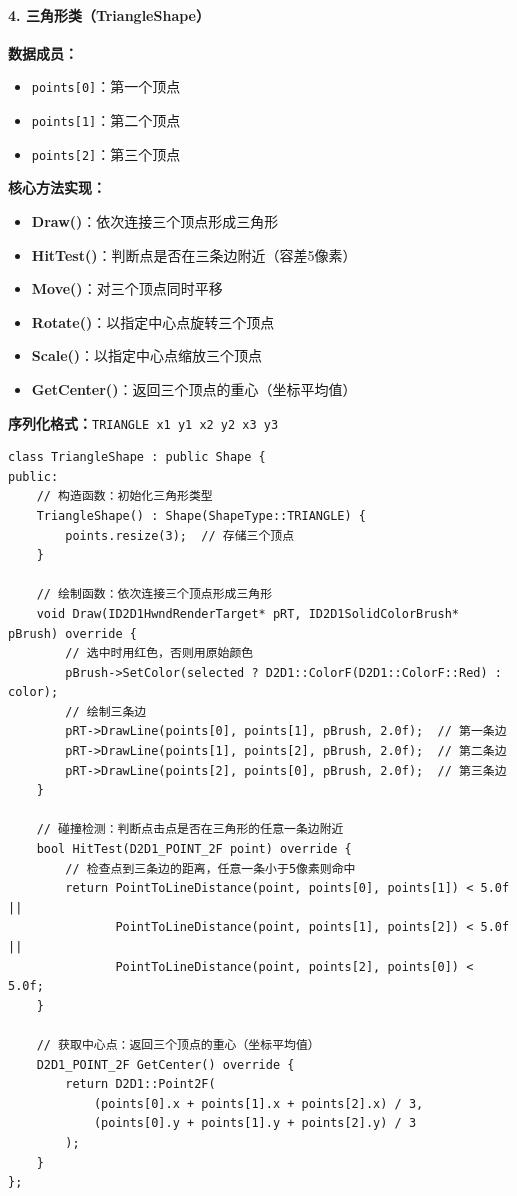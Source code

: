 \documentclass[12pt,a4paper]{article}
\begin{document}
\paragraph{4. 三角形类（TriangleShape）}

\begin{tcolorbox}
\textbf{数据成员：}
\begin{itemize}
    \item \texttt{points[0]}：第一个顶点
    \item \texttt{points[1]}：第二个顶点
    \item \texttt{points[2]}：第三个顶点
\end{itemize}

\textbf{核心方法实现：}
\begin{itemize}
    \item \textbf{Draw()}：依次连接三个顶点形成三角形
    \item \textbf{HitTest()}：判断点是否在三条边附近（容差5像素）
    \item \textbf{Move()}：对三个顶点同时平移
    \item \textbf{Rotate()}：以指定中心点旋转三个顶点
    \item \textbf{Scale()}：以指定中心点缩放三个顶点
    \item \textbf{GetCenter()}：返回三个顶点的重心（坐标平均值）
\end{itemize}

\textbf{序列化格式：}\texttt{TRIANGLE x1 y1 x2 y2 x3 y3}
\end{tcolorbox}

\begin{lstlisting}[caption=TriangleShape类定义]
class TriangleShape : public Shape {
public:
    // 构造函数：初始化三角形类型
    TriangleShape() : Shape(ShapeType::TRIANGLE) {
        points.resize(3);  // 存储三个顶点
    }
    
    // 绘制函数：依次连接三个顶点形成三角形
    void Draw(ID2D1HwndRenderTarget* pRT, ID2D1SolidColorBrush* pBrush) override {
        // 选中时用红色，否则用原始颜色
        pBrush->SetColor(selected ? D2D1::ColorF(D2D1::ColorF::Red) : color);
        // 绘制三条边
        pRT->DrawLine(points[0], points[1], pBrush, 2.0f);  // 第一条边
        pRT->DrawLine(points[1], points[2], pBrush, 2.0f);  // 第二条边
        pRT->DrawLine(points[2], points[0], pBrush, 2.0f);  // 第三条边
    }
    
    // 碰撞检测：判断点击点是否在三角形的任意一条边附近
    bool HitTest(D2D1_POINT_2F point) override {
        // 检查点到三条边的距离，任意一条小于5像素则命中
        return PointToLineDistance(point, points[0], points[1]) < 5.0f ||
               PointToLineDistance(point, points[1], points[2]) < 5.0f ||
               PointToLineDistance(point, points[2], points[0]) < 5.0f;
    }
    
    // 获取中心点：返回三个顶点的重心（坐标平均值）
    D2D1_POINT_2F GetCenter() override {
        return D2D1::Point2F(
            (points[0].x + points[1].x + points[2].x) / 3,
            (points[0].y + points[1].y + points[2].y) / 3
        );
    }
};
\end{lstlisting}
\end{document}
